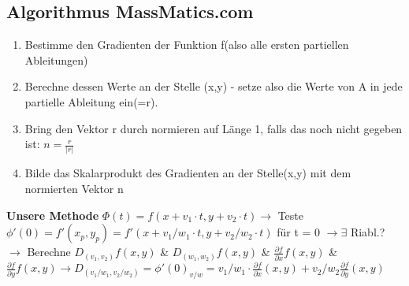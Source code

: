 	\subsection {Algorithmus MassMatics.com}
		\begin{footnotesize}
		\begin{enumerate}
		\small\item Bestimme den Gradienten der Funktion f(also alle ersten partiellen Ableitungen)
		\small\item Berechne dessen Werte an der Stelle (x,y) - setze also die Werte von A in jede partielle Ableitung ein(=r).
		\small\item Bring den Vektor r durch normieren auf Länge 1, falls das noch nicht gegeben ist: $ n = \frac{r}{\left|r\right|} $
		\small\item Bilde das Skalarprodukt des Gradienten an der Stelle(x,y) mit dem normierten Vektor n
		\end{enumerate}
		\end{footnotesize}
		\begin{footnotesize}
		\textbf{Unsere Methode}
		$\Phi(t) = f(x+v_1\cdot t, y+v_2\cdot t) \rightarrow$ Teste $\phi '(0)= f'(x_p,y_p) = f'(x+v_1/w_1\cdot t, y+ v_2/w_2\cdot t)$ für t = 0 $\rightarrow \exists$ Riabl.? $\rightarrow$ Berechne $D_{(v_1,v_2)}f(x,y)$ \& $D_{(w_1,w_2)}f(x,y)$ \& $\frac{\partial f}{\partial x}f(x,y)$ \& $\frac{\partial f}{\partial y}f(x,y) \rightarrow D_{(v_1/w_1,v_2/w_2)} = \phi'(0)_{v/w} = v_1/w_1 \cdot \frac{\partial f}{\partial x}(x,y) + v_2/w_2 \frac{\partial f}{\partial y}(x,y)$
		\end{footnotesize}
	
